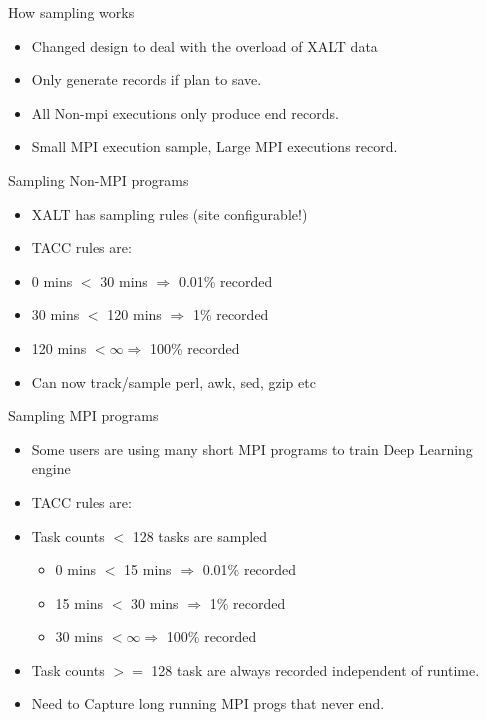 \documentclass{beamer}
\begin{document}
\begin{frame}{How sampling works}
  \begin{itemize}
    \item Changed design to deal with the overload of XALT data
    \item Only generate records if plan to save.
    \item All Non-mpi executions only produce end records.
    \item Small MPI execution sample, Large MPI executions record.
  \end{itemize}
\end{frame}

\begin{frame}{Sampling Non-MPI programs}
  \begin{itemize}
    \item XALT has sampling rules (site configurable!)
    \item TACC rules are:
    \item 0 mins $<$ 30 mins $\Rightarrow$ 0.01\% recorded  
    \item 30 mins $<$ 120 mins $\Rightarrow$ 1\% recorded  
    \item 120 mins $<  \infty \Rightarrow$ 100\% recorded
    \item Can now track/sample perl, awk, sed, gzip etc
  \end{itemize}
\end{frame}

\begin{frame}{Sampling MPI programs}
  \begin{itemize}
    \item Some users are using many short MPI programs to train Deep
      Learning engine
    \item TACC rules are:
    \item Task counts $<$ 128 tasks are sampled
      \begin{itemize}
        \item 0 mins $<$ 15 mins $\Rightarrow$ 0.01\% recorded  
        \item 15 mins $<$ 30 mins $\Rightarrow$ 1\% recorded  
        \item 30 mins $<  \infty \Rightarrow$ 100\% recorded
      \end{itemize}
    \item Task counts $>=$ 128 task are always recorded independent of runtime.
    \item Need to Capture long running MPI progs that never end.
  \end{itemize}
\end{frame}
\end{document}

